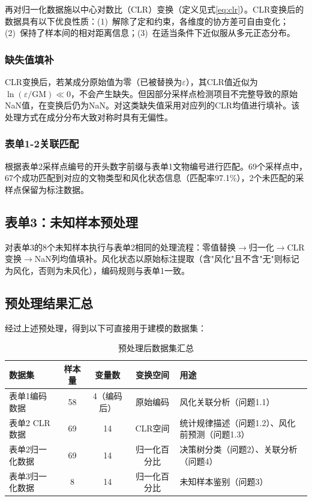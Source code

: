 \documentclass[12pt,a4paper]{ctexart}
\begin{document}
再对归一化数据施以中心对数比（CLR）变换（定义见式\ref{eq:clr}）。CLR变换后的数据具有以下优良性质：(1)~解除了定和约束，各维度的协方差可自由变化；(2)~保持了样本间的相对距离信息；(3)~在适当条件下近似服从多元正态分布。

\subsubsection{缺失值填补}

CLR变换后，若某成分原始值为零（已被替换为$\varepsilon$），其CLR值近似为$\ln(\varepsilon/\text{GM})\ll0$，不会产生缺失。但因部分采样点检测项目不完整导致的原始NaN值，在变换后仍为NaN。对这类缺失值采用对应列的CLR均值进行填补。该处理方式在成分分布大致对称时具有无偏性。

\subsubsection{表单1-2关联匹配}

根据表单2采样点编号的开头数字前缀与表单1文物编号进行匹配。69个采样点中，67个成功匹配到对应的文物类型和风化状态信息（匹配率97.1\%），2个未匹配的采样点保留为标注数据。

\subsection{表单3：未知样本预处理}

对表单3的8个未知样本执行与表单2相同的处理流程：零值替换$\rightarrow$归一化$\rightarrow$CLR变换$\rightarrow$NaN列均值填补。风化状态以原始标注提取（含"风化"且不含"无"则标记为风化，否则为未风化），编码规则与表单1一致。

\subsection{预处理结果汇总}

经过上述预处理，得到以下可直接用于建模的数据集：

\begin{table}[H]
\centering
\caption{预处理后数据集汇总}
\label{tab:preprocess}
\begin{tabularx}{\textwidth}{lcccY}
\toprule
数据集 & 样本量 & 变量数 & 变换空间 & 用途 \\
\midrule
表单1编码数据 & 58 & 4（编码后）& 原始编码 & 风化关联分析（问题1.1）\\
表单2 CLR数据 & 69 & 14 & CLR空间 & 统计规律描述（问题1.2）、风化前预测（问题1.3）\\
表单2归一化数据 & 69 & 14 & 归一化百分比 & 决策树分类（问题2）、关联分析（问题4）\\
表单3归一化数据 & 8 & 14 & 归一化百分比 & 未知样本鉴别（问题3）\\
\bottomrule
\end{tabularx}
\end{table}
\end{document}
